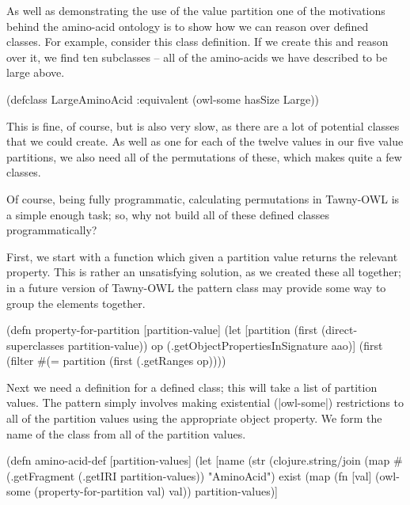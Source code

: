 As well as demonstrating the use of the value partition one of the motivations
behind the amino-acid ontology is to show how we can reason over defined
classes. For example, consider this class definition. If we create this and
reason over it, we find ten subclasses -- all of the amino-acids we have
described to be large above.

\begin{tawnyexample}
(defclass LargeAminoAcid
  :equivalent (owl-some hasSize Large))
\end{tawnyexample}

This is fine, of course, but is also very slow, as there are a lot of
potential classes that we could create. As well as one for each of the twelve
values in our five value partitions, we also need all of the permutations of
these, which makes quite a few classes.

Of course, being fully programmatic, calculating permutations in Tawny-OWL is
a simple enough task; so, why not build all of these defined classes
programmatically?

First, we start with a function which given a partition value returns the
relevant property. This is rather an unsatisfying solution, as we created
these all together; in a future version of Tawny-OWL the pattern class may
provide some way to group the elements together.

\begin{tawny}
(defn property-for-partition [partition-value]
  (let [partition
        (first (direct-superclasses partition-value))
        op
        (.getObjectPropertiesInSignature aao)]
    (first
     (filter
      #(= partition
          (first (.getRanges %
      op))))
\end{tawny}

Next we need a definition for a defined class; this will take a list of
partition values. The pattern simply involves making existential (|owl-some|)
restrictions to all of the partition values using the appropriate object
property. We form the name of the class from all of the partition values.

\begin{tawny}
(defn amino-acid-def [partition-values]
  (let [name
        (str
         (clojure.string/join
          (map
           #(.getFragment
             (.getIRI %
           partition-values))
         "AminoAcid")
        exist
        (map
         (fn [val]
           (owl-some
            (property-for-partition val)
            val))
         partition-values)]
\end{tawny}

